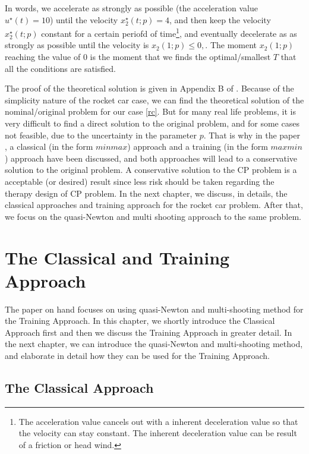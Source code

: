 \documentclass  [
  paper    = a4,
  BCOR     = 10mm,
  twoside,
  fontsize = 12pt,
  fleqn,
  toc      = bibnumbered,
  toc      = listofnumbered,
  numbers  = noendperiod,
  headings = normal,
  listof   = leveldown,
  version  = 3.03
]                                       {scrreprt}
\newcommand{\<}{\langle}
\renewcommand{\>}{\rangle}
\begin{document}
   In words, we accelerate as strongly as possible (the acceleration value $u^\star(t)=10$) until the velocity $x^\star_2(t;p)=4$, and then keep the velocity $x^\star_2(t;p)$ constant for a certain periofd of time\footnote{The acceleration value cancels out with a inherent deceleration value so that the velocity can stay constant. The inherent deceleration value can be result of a friction or head wind.}, and eventually decelerate as as strongly as possible until the velocity is $x_2(1;p) \leq 0, \label{rc_x2_t1}$. The moment $x_2(1;p)$ reaching the value of $0$ is the moment that we finds the optimal/smallest $T$ that all the conditions are satisfied. 
   
   The proof of the theoretical solution is given in Appendix B of \cite{MatSch22}. Because of the simplicity nature of the rocket car case, we can find the theoretical solution of the nominal/original problem for our case \ref{rc}. But for many real life problems, it is very difficult to find a direct solution to the original problem, and for some cases not feasible, due to the uncertainty in the parameter $p$. That is why in the paper \cite{MatSch22}, a classical (in the form $minmax$) approach and a training (in the form $maxmin$) approach have been discussed, and both approaches will lead to a conservative solution to the original problem. A conservative solution to the CP problem is a acceptable (or desired) result since less risk should be taken regarding the therapy design of CP problem. In the next chapter, we discuss, in details, the classical approaches and training approach for the rocket car problem. After that, we focus on the quasi-Newton and multi shooting approach to the same problem.  
   
   
   
   
   
   \chapter{The Classical and Training Approach}
   
   The paper on hand focuses on using quasi-Newton and multi-shooting method for the Training Approach. In this chapter, we shortly introduce the Classical Approach first and then we discuss the Training Approach in greater detail. In the next chapter, we can introduce the quasi-Newton and multi-shooting method, and elaborate in detail how they can be used for the Training Approach. 
   
   
   
   \section{The Classical Approach}
   
\end{document}
